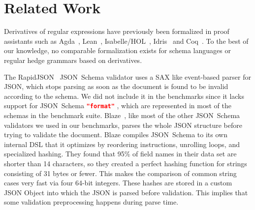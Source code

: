 \documentclass[acmsmall,%
  screen,%
  authorversion, %
  nonacm%
]{acmart}
\newcommand{\JSONSchema}{%
  JSON~Schema\xspace%
}
\newcommand{\format}{%
  \lstinline[language=json]|"format"|\xspace%
}
\newcommand{\DSL}{\ac{DSL}\xspace}
\newcommand{\JSON}{\ac{JSON}\xspace}
\newcommand{\SAX}{\ac{SAX}\xspace}
\begin{document}
\section{Related Work}
\label{section_related}

Derivatives of regular expressions have previously been formalized in proof assistants such as Agda~\cite{elliott2021symbolic}, Lean~\cite{zhuchko2024lean}, Isabelle/HOL~\cite{isaregex}, Idris~\cite{idrisregex} and Coq~\cite{moreira2012deciding, doczkal2013constructive, chlipala2008certified, coquand2011decision, de2024coq, coqlex}.
To the best of our knowledge, no comparable formalization exists for schema languages or regular hedge grammars based on derivatives.

The RapidJSON~\cite{jsonschema_impl_rapidjson} \JSONSchema validator uses a \SAX like event-based parser for JSON, which stops parsing as soon as the document is found to be invalid according to the schema.
We did not include it in the benchmarks since it lacks support for \JSONSchema \format, which are represented in most of the schemas in the benchmark suite.
Blaze~\cite{blaze}, like most of the other \JSONSchema validators we used in our benchmarks, parses the whole \JSON structure before trying to validate the document.
Blaze compiles \JSONSchema to its own internal \DSL that it optimizes by reordering instructions, unrolling loops, and specialized hashing.
They found that 95\% of field names in their data set are shorter than 14 characters, so they created a perfect hashing function for strings consisting of 31 bytes or fewer.
This makes the comparison of common string cases very fast via four 64-bit integers.
These hashes are stored in a custom \JSON Object into which the \JSON is parsed before validation.
This implies that some validation preprocessing happens during parse time.
\end{document}
